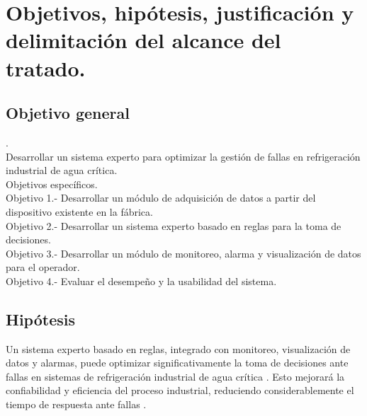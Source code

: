 \section{Objetivos, hipótesis, justificación y delimitación del alcance del tratado.}
\subsection{Objetivo general}.\\
Desarrollar un sistema experto para optimizar la gestión de fallas en refrigeración industrial de agua crítica.\\
Objetivos específicos.\\
Objetivo 1.- Desarrollar un módulo de adquisición de datos a partir del
dispositivo existente en la fábrica.\\
Objetivo 2.- Desarrollar un sistema experto basado en reglas para la toma
de decisiones.\\
Objetivo 3.- Desarrollar un módulo de monitoreo, alarma y visualización
de datos para el operador.\\
Objetivo 4.- Evaluar el desempeño y la usabilidad del sistema.
\subsection{Hipótesis}

Un sistema experto basado en reglas, integrado con monitoreo, visualización
de datos y alarmas, puede optimizar significativamente la toma de decisiones
ante fallas en sistemas de refrigeración industrial de agua crítica \cite{Angel}. Esto
mejorará la confiabilidad y eficiencia del proceso industrial, reduciendo considerablemente
el tiempo de respuesta ante fallas \cite{Cobian}.

